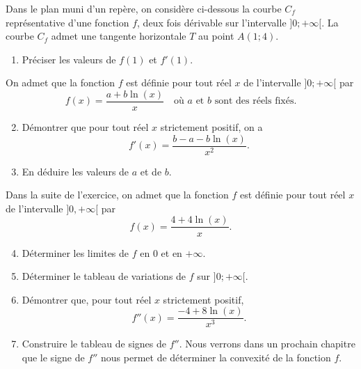 \documentclass[11pt,fleqn, openany]{book} %
\begin{document}
\begin{exercise}[topic=log04, subtitle={(Amérique du Nord 2021)}] Dans le plan muni d'un repère, on considère ci-dessous la courbe $C_f$
représentative d'une fonction $f$, deux fois dérivable sur l'intervalle $]0;+\infty[$. La courbe $C_f$ admet une tangente horizontale $T$ au point $A(1;4)$.

\begin{center}
\end{center}

\begin{enumerate}
\item Préciser les valeurs de $f(1)$ et $f'(1)$.
\end{enumerate}
On admet que la fonction $f$ est définie pour tout réel $x$ de l'intervalle $]0;+\infty [$ par
\[f(x)=\dfrac{a+b\ln(x)}{x} \quad \text{où } a \text{ et }b\text{ sont des réels fixés.}\]
\begin{enumerate}
\setcounter{enumi}{1}
\item Démontrer que pour tout réel $x$ strictement positif, on a
\[f'(x)=\dfrac{b-a-b\ln(x)}{x^2}.\]
\item En déduire les valeurs de $a$ et de $b$.
\end{enumerate}
Dans la suite de l'exercice, on admet que la fonction $f$ est définie pour tout réel $x$ de l'intervalle $]0,+\infty[$ par
\[f(x)=\dfrac{4+4\ln(x)}{x}.\]
\begin{enumerate}
\setcounter{enumi}{3}
\item Déterminer les limites de $f$ en $0$ et en $+\infty$.
\item Déterminer le tableau de variations de $f$ sur $]0;+\infty[$.
\item Démontrer que, pour tout réel $x$ strictement positif,
\[f''(x)=\dfrac{-4+8\ln(x)}{x^3}.\]
\item Construire le tableau de signes de $f''$. Nous verrons dans un prochain chapitre que le signe de $f''$ nous permet de déterminer la convexité de la fonction $f$.
\end{enumerate}
\newpage
\end{exercise}
\end{document}
